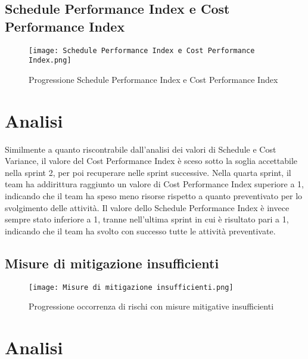 \newpage

\subsection{Schedule Performance Index e Cost Performance Index}
\label{subsec:Schedule Performance Index e Cost Performance Index}

\begin{figure}[h] 
    \centering
    \texttt{[image: Schedule Performance Index e Cost Performance Index.png]}
    \caption{Progressione Schedule Performance Index e Cost Performance Index} 
    \label{fig: Schedule Performance Index e Cost Performance Index}
\end{figure}

\section*{Analisi}

Similmente a quanto riscontrabile dall’analisi dei valori di Schedule e Cost Variance,
il valore del Cost Performance Index è sceso sotto la soglia accettabile nella 
sprint 2, per poi recuperare nelle sprint successive. Nella quarta sprint, il team
ha addirittura raggiunto un valore di Cost Performance Index superiore a 1, indicando
che il team ha speso meno risorse rispetto a quanto preventivato per lo svolgimento delle
attività. Il valore dello Schedule Performance Index è invece sempre stato inferiore a 1,
tranne nell'ultima sprint in cui è risultato pari a 1, indicando che il team ha svolto
con successo tutte le attività preventivate.

\newpage

\subsection{Misure di mitigazione insufficienti}
\label{subsec:Misure di mitigazione insufficienti}

\begin{figure}[h] 
    \centering
    \texttt{[image: Misure di mitigazione insufficienti.png]}
    \caption{Progressione occorrenza di rischi con misure mitigative insufficienti} 
    \label{fig: Misure di mitigazione insufficienti}
\end{figure}

\section*{Analisi}


